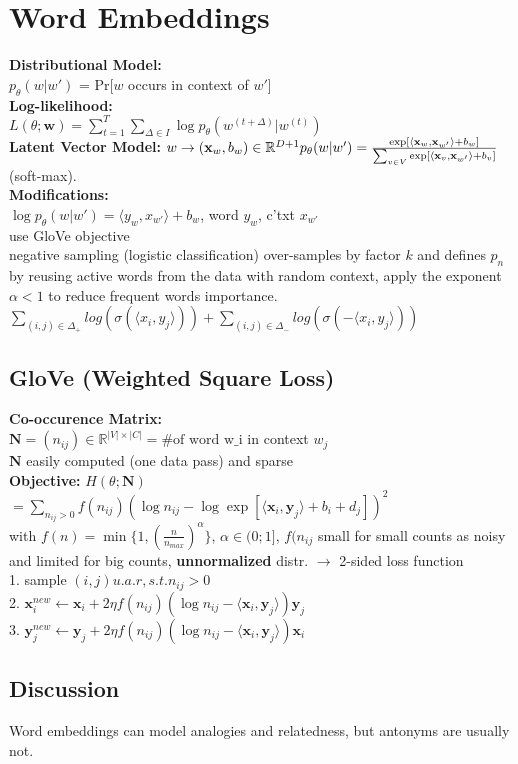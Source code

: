 \section{Word Embeddings}
\textbf{Distributional Model:}\\
$p_\theta(w|w')$ = Pr[$w$ occurs in context of $w'$]\\
\textbf{Log-likelihood:}\\
$L(\theta; \mathbf{w}) = \sum_{t=1}^T\sum_{\Delta \in I}{\log p_\theta(w^{(t+\Delta)}|w^{(t)})}$\\
\textbf{Latent Vector Model:} $w \rightarrow (\mathbf{x}_w, b_w) \in \mathbb{R}^{D+1} \\p_{\theta}(w|w') = \frac{\exp[\langle \mathbf{x}_w,\mathbf{x}_{w'}\rangle + b_w]}{\sum_{v\in V}{\exp[\langle \mathbf{x}_v,\mathbf{x}_{w'}\rangle + b_v ]}}$ (soft-max).\\
\textbf{Modifications:}\\
$\log p_{\theta}(w|w') = \langle  y_{w} , x_{w'} \rangle + b_w$,  word $y_w$, c'txt $x_{w'}$\\
use GloVe objective\\
negative sampling (logistic classification) over-samples by factor $k$ and defines $p_n$ by reusing active words from the data with random context, apply the exponent $\alpha<1$ to reduce frequent words importance.\\
$
\sum_{(i,j)\in\Delta_+}log(\sigma(\langle x_i, y_j\rangle)) + \sum_{(i,j)\in\Delta_-}log(\sigma(-\langle x_i, y_j\rangle))
$
\subsection*{GloVe (Weighted Square Loss)}
\textbf{Co-occurence Matrix:}\\
$\mathbf{N} = (n_{ij}) \in \mathbb{R}^{|V|\times|C|} = \text{\# of word w_i}$ in context $w_j$\\
$\mathbf{N}$ easily computed (one data pass) and sparse\\
\textbf{Objective:} $H(\theta;\mathbf{N})$\\
$= \sum_{n_{ij} > 0} f(n_{ij})(\log n_{ij} - \log \exp[\langle \mathbf{x}_i, \mathbf{y}_j \rangle + b_i + d_j])^2$\\
with $f(n) = \min\{1, (\frac{n}{n_{max}})^\alpha\}$, $\alpha \in (0;1]$, $f(n_{ij}$ small for small counts as noisy and limited for big counts,
\textbf{unnormalized} distr. $\rightarrow$ 2-sided loss function\\
1. sample $(i,j) u.a.r, s.t. n_{ij}>0$\\
2. $\mathbf{x}_i^{new} \leftarrow \mathbf{x}_i + 2\eta f(n_{ij})(\log n_{ij} - \langle \mathbf{x}_i, \mathbf{y}_j \rangle)\mathbf{y}_j$\\
3. $\mathbf{y}_j^{new} \leftarrow \mathbf{y}_j + 2\eta f(n_{ij})(\log n_{ij} - \langle \mathbf{x}_i, \mathbf{y}_j \rangle)\mathbf{x}_i$

\subsection*{Discussion}
Word embeddings can model analogies and relatedness, but antonyms are usually not.
